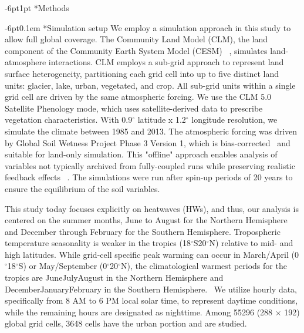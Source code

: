 \documentclass[]{nature}
\makeatletter
\renewcommand{\section}{\@startsection {section}{1}{0pt}%
    {-6pt}{1pt}%
    {\large\sffamily\bfseries}%
    }
\renewcommand{\subsection}{\@startsection {subsection}{2}{0pt}%
    {-6pt}{0.1em}%
    {\fontsize{12pt}{14pt}\selectfont\sffamily\bfseries}%
    }
\makeatother
\begin{document}
    
\section*{Methods}




\subsection*{Simulation setup }We employ a simulation approach in this study to allow full global coverage. The Community Land Model (CLM), the land component of the Community Earth System Model (CESM)\unskip~\cite{2755510:33598890} , simulates land-atmosphere interactions. CLM employs a sub-grid approach to represent land surface heterogeneity, partitioning each grid cell into up to five distinct land units:   glacier, lake, urban, vegetated, and crop. All sub-grid units within a single grid cell are driven by the same atmospheric forcing. We use the CLM 5.0\unskip~\cite{2755510:33598910}  Satellite Phenology mode, which uses satellite-derived data to prescribe vegetation characteristics. With 0.9\ensuremath{^\circ} latitude x 1.2\ensuremath{^\circ} longitude resolution, we simulate the climate between 1985 and 2013.  The atmospheric forcing was driven by Global Soil Wetness Project Phase 3 Version 1, which is bias-corrected\unskip~\cite{2755510:33598910}  and suitable for land-only simulation. This "offline" approach enables analysis of variables not typically archived from fully-coupled runs while preserving realistic feedback effects\unskip~\cite{2755510:33598945} . The simulations were run after spin-up periods of 20 years to ensure the equilibrium of the soil variables.

This study today focuses explicitly on heatwaves (HWs), and thus, our analysis is centered on the summer months, June to August for the Northern Hemisphere and December through February for the Southern Hemisphere. Tropospheric temperature seasonality is weaker in the tropics (18\ensuremath{^\circ}S{\textendash}20\ensuremath{^\circ}N) relative to mid- and high latitudes. While grid-cell specific peak warming can occur in March/April (0\ensuremath{^\circ}{\textendash}18\ensuremath{^\circ}S) or May/September (0\ensuremath{^\circ}{\textendash}20\ensuremath{^\circ}N), the climatological warmest periods for the tropics are June{\textendash}July{\textendash}August in the Northern Hemisphere and December{\textendash}January{\textendash}February in the Southern Hemisphere.\unskip~\cite{2755510:33598947}  We utilize hourly data, specifically from 8 AM to 6 PM local solar time, to represent daytime conditions, while the remaining hours are designated as nighttime. Among 55296 (288 \ensuremath{\times} 192) global grid cells, 3648 cells have the urban portion and are studied.
\end{document}
